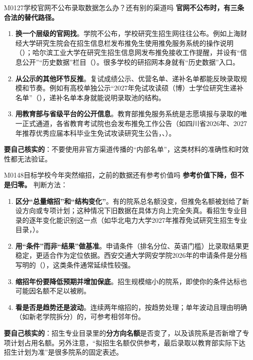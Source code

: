 \begin{qa}{M0127}{学校官网不公布录取数据怎么办？还有别的渠道吗}
\textbf{官网不公布时，有三条合法的替代路径。}
\begin{enumerate}
  \item \textbf{换一个层级的官网找}。学院不公布，学校研究生招生网往往公布。例如上海财经大学研究生院会在招生信息栏发布推免生使用推免服务系统的操作说明（）；哈尔滨工业大学在研究生招生信息网发布推免接收工作提醒，并设有“信息公开”“历史数据”栏目（）。很多学校的研招网本身就有“历史数据”入口。
  \item \textbf{从公示的其他环节反推}。复试成绩公示、优营名单、递补名单都能反映录取规模和节奏。例如有高校单独公示“2027年免试攻读硕（博）士学位研究生递补名单”（），递补名单本身就能说明录取池的结构。
  \item \textbf{用教育部与省级平台的公开信息}。教育部推免服务系统是志愿填报与录取的唯一正式通道，各省教育考试院也会发布推免工作公告（如四川省2026年、2027年推荐优秀应届本科毕业生免试攻读研究生公告，、）。
\end{enumerate}
\textbf{要自己核实的}：不要使用非官方渠道传播的“内部名单”，这类材料的准确性和时效性都无法验证。
\end{qa}

\begin{qa}{M0148}{目标学校今年突然缩招，之前的数据还有参考价值吗}
\textbf{参考价值下降，但不是归零。} 判断方法：
\begin{enumerate}
  \item \textbf{区分“总量缩招”和“结构变化”}。有的院系总名额没变，但推免名额被划给了新设方向或专项计划；这种情况下旧数据在具体方向上完全失真。看招生专业目录的逐年变化能识别这一点（如华北电力大学2027年推荐免试研究生招生专业目录，）。
  \item \textbf{用“条件”而非“结果”做基准}。申请条件（排名分位、英语门槛）比录取结果更稳定，更适合作为定位依据。西安交通大学网安学院2026年的申请条件是分档写明的（），这类条件通常延续性较强。
  \item \textbf{缩招年份要降低预期并增加保底}。招生规模缩小的院系，即使你的条件达标也可能因名额不足以被刷。
  \item \textbf{看是否是趋势还是波动}。连续两年缩招的，按趋势处理；单年波动且理由明确（如新老学院拆分）的，可参考相邻年份。
\end{enumerate}
\textbf{要自己核实的}：招生专业目录里的\textbf{分方向名额}是否变了，以及该院系是否新增了专项计划占用名额。另外注意，“拟招生名额仅供参考，最后录取以教育部实际下达招生计划为准”是很多院系的固定表述。
\end{qa}

